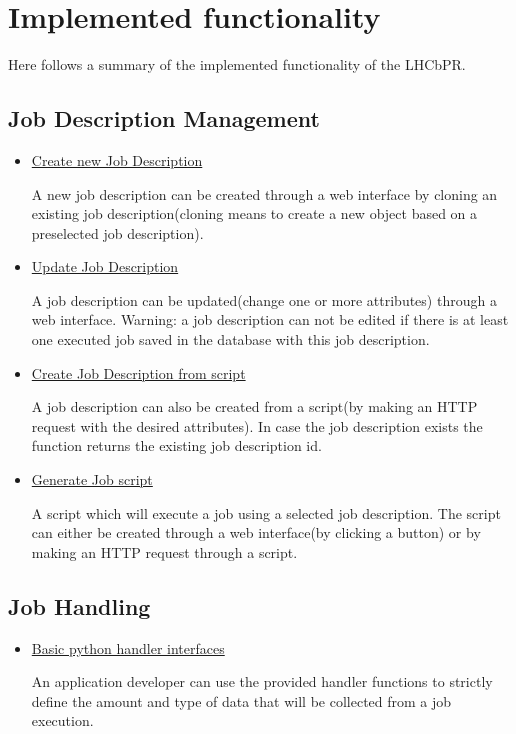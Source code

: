 \documentclass{lhcbnote}
\begin{document}
\section{Implemented functionality}

Here follows a summary of the implemented functionality of the LHCbPR.

\subsection{Job Description Management}
\begin{itemize}
\item
\underline{Create new Job Description} 

A new job description can be created through a web interface by 
 cloning an existing job description(cloning means to create a new object based 
 on a preselected job description).

\item
\underline{Update Job Description}

A job description can be updated(change one or more attributes) through a web interface.
Warning: a job description can not be edited if there is at least one executed job saved in the database with this job description.

\item
\underline{Create Job Description from script} 

A job description can also be created from a script(by making an HTTP request with the desired attributes). 
In case the job description exists the function returns the existing job description id.

\item
\underline{Generate Job script}

A script which will execute a job using a selected job description. The script can either be created through a web 
interface(by clicking a button) or by making an HTTP request through a script.
\end{itemize}

\subsection{Job Handling}
\begin{itemize}
\item
\underline{Basic python handler interfaces}

An application developer can use the provided handler functions to strictly define the amount and type of data that will be collected from a job execution. 
\end{itemize}
\end{document}
